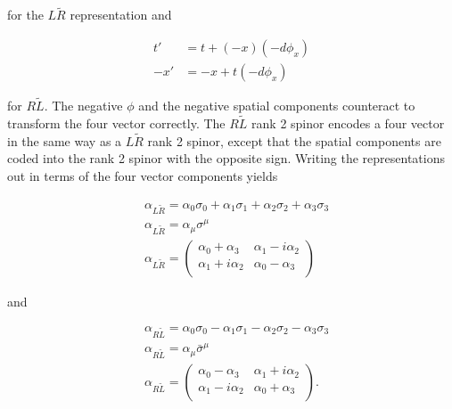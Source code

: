 for the $L\tilde{R}$ representation and 

\begin{equation}
\begin{split}
t' &= t + (-x)(-d\phi_x) \\ 
-x' &= -x + t(-d\phi_x)  
\end{split}
\end{equation}

for $R\tilde{L}$. The negative $\phi$ and the negative spatial components counteract to transform the four vector correctly. The $R\tilde{L}$ rank 2 spinor encodes a four vector in the same way as a $L\tilde{R}$ rank 2 spinor, except that the spatial components are coded into the rank 2 spinor with the opposite sign. Writing the representations out in terms of the four vector components yields
  
\begin{equation}
\begin{split}
&\alpha_{L\tilde{R}} = \alpha_0 \sigma_0 + \alpha_1 \sigma_1 + \alpha_2 \sigma_2 + \alpha_3 \sigma_3 \\
&\alpha_{L\tilde{R}} = \alpha_\mu \sigma^\mu \\
&\alpha_{L\tilde{R}} = 
\begin{pmatrix}
\alpha_0 + \alpha_3 & \alpha_1 - i\alpha_2 \\
\alpha_1 + i\alpha_2 & \alpha_0 - \alpha_3 \\
\end{pmatrix}
\end{split}
\end{equation}

and

\begin{equation}
\begin{split}
&\alpha_{R\tilde{L}} = \alpha_0 \sigma_0 - \alpha_1 \sigma_1 - \alpha_2 \sigma_2 - \alpha_3 \sigma_3 \\
&\alpha_{R\tilde{L}} = \alpha_\mu \bar{\sigma}^\mu \\
&\alpha_{R\tilde{L}} = 
\begin{pmatrix}
\alpha_0 - \alpha_3 & \alpha_1 + i\alpha_2 \\
\alpha_1 - i\alpha_2 & \alpha_0 + \alpha_3 \\
\end{pmatrix}.
\end{split}
\end{equation}

